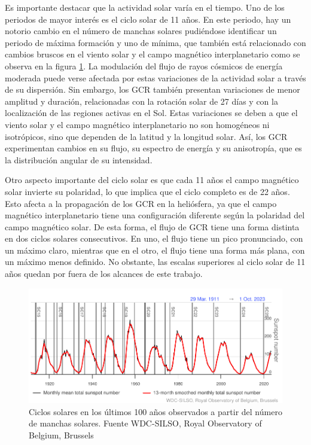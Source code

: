 Es importante destacar que la actividad solar varía en el tiempo. Uno de los periodos de mayor interés es el ciclo solar de 11 años. En este periodo, hay un notorio cambio en el número de manchas solares pudiéndose identificar un periodo de máxima formación y uno de mínima, que también está relacionado con cambios bruscos en el viento solar y el campo magnético interplanetario como se observa en la figura \ref{fig:100ysn}. La modulación del flujo de rayos cósmicos de energía moderada puede verse afectada por estas variaciones de la actividad solar a través de su dispersión. Sin embargo, los GCR también presentan variaciones de menor amplitud y duración, relacionadas con la rotación solar de 27 días y con la localización de las regiones activas en el Sol. Estas variaciones se deben a que el viento solar y el campo magnético interplanetario no son homogéneos ni isotrópicos, sino que dependen de la latitud y la longitud solar. Así, los GCR experimentan cambios en su flujo, su espectro de energía y su anisotropía, que es la distribución angular de su intensidad.

Otro aspecto importante del ciclo solar es que cada 11 años el campo magnético solar invierte su polaridad, lo que implica que el ciclo completo es de 22 años. Esto afecta a la propagación de los GCR en la heliósfera, ya que el campo magnético interplanetario tiene una configuración diferente según la polaridad del campo magnético solar. De esta forma, el flujo de GCR tiene una forma distinta en dos ciclos solares consecutivos. En uno, el flujo tiene un pico pronunciado, con un máximo claro, mientras que en el otro, el flujo tiene una forma más plana, con un máximo menos definido. No obstante, las escalas superiores al ciclo solar de 11 años quedan por fuera de los alcances de este trabajo.
\begin{figure}
    \centering
    \includegraphics[width=0.8\linewidth]{Figs/sunspots.pdf}
    \caption{Ciclos solares en los últimos 100 años observados a partir del número de manchas solares. Fuente WDC-SILSO, Royal Observatory of Belgium, Brussels}
    \label{fig:100ysn}
\end{figure}

